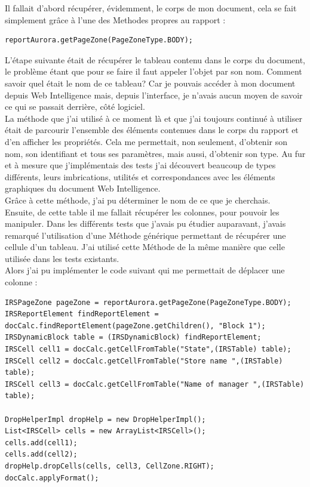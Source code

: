 Il fallait d'abord r\'{e}cup\'{e}rer, \'{e}videmment, le corps de mon document, cela se fait simplement gr\^{a}ce \`{a} l'une des \glspl{Methode} propres au rapport :
\begin{lstlisting}
reportAurora.getPageZone(PageZoneType.BODY);
\end{lstlisting}
L'\'{e}tape suivante \'{e}tait de r\'{e}cup\'{e}rer le tableau contenu dans le corps du document, le probl\`{e}me \'{e}tant que pour se faire il faut appeler l'objet par son nom. Comment savoir quel \'{e}tait le nom de ce tableau? Car je pouvais acc\'{e}der \`{a} mon document depuis Web Intelligence mais, depuis l'interface, je n'avais aucun moyen de savoir ce qui se passait derri\`{e}re, c\^{o}t\'{e} logiciel.\\
La m\'{e}thode que j'ai utilis\'{e} \`{a} ce moment l\`{a} et que j'ai toujours continu\'{e} \`{a} utiliser \'{e}tait de parcourir l'ensemble des \'{e}l\'{e}ments contenues dans le corps du rapport et d'en afficher les propri\'{e}t\'{e}s. Cela me permettait, non seulement, d'obtenir son nom, son identifiant et tous ses param\`{e}tres, mais aussi, d'obtenir son type. Au fur et \`{a} mesure que j'impl\'{e}mentais des tests j'ai d\'{e}couvert beaucoup de types diff\'{e}rents, leurs imbrications, utilit\'{e}s et correspondances avec les \'{e}l\'{e}ments graphiques du document Web Intelligence.\\
Gr\^{a}ce \`{a} cette m\'{e}thode, j'ai pu d\'{e}terminer le nom de ce que je cherchais.\\
Ensuite, de cette table il me fallait r\'{e}cup\'{e}rer les colonnes, pour pouvoir les manipuler. Dans les diff\'{e}rents tests que j'avais pu \'{e}tudier auparavant, j'avais remarqu\'{e} l'utilisation d'une M\'{e}thode g\'{e}n\'{e}rique permettant de r\'{e}cup\'{e}rer une cellule d'un tableau. J'ai utilis\'{e} cette M\'{e}thode de la m\^{e}me mani\`{e}re que celle utilis\'{e}e dans les tests existants. \\
Alors j'ai pu impl\'{e}menter le code suivant qui me permettait de d\'{e}placer une colonne :


\begin{lstlisting}
IRSPageZone pageZone = reportAurora.getPageZone(PageZoneType.BODY);
IRSReportElement findReportElement = docCalc.findReportElement(pageZone.getChildren(), "Block 1");
IRSDynamicBlock table = (IRSDynamicBlock) findReportElement;
IRSCell cell1 = docCalc.getCellFromTable("State",(IRSTable) table);
IRSCell cell2 = docCalc.getCellFromTable("Store name ",(IRSTable) table);
IRSCell cell3 = docCalc.getCellFromTable("Name of manager ",(IRSTable) table);

DropHelperImpl dropHelp = new DropHelperImpl();
List<IRSCell> cells = new ArrayList<IRSCell>();
cells.add(cell1);
cells.add(cell2);
dropHelp.dropCells(cells, cell3, CellZone.RIGHT);
docCalc.applyFormat();
\end{lstlisting}

